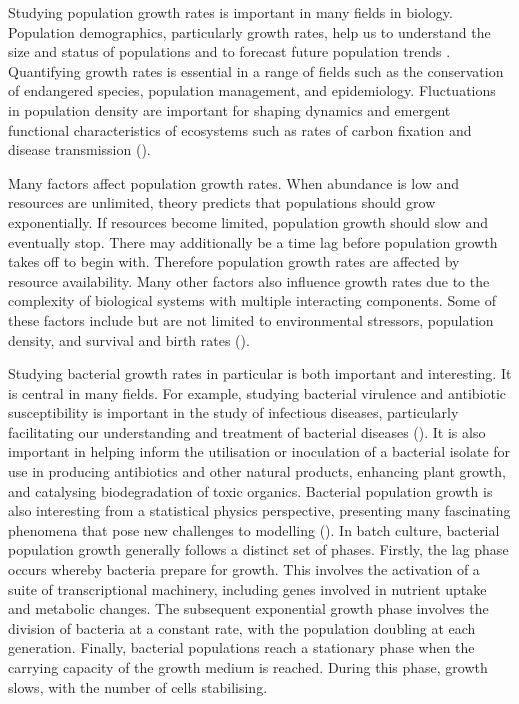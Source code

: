 \documentclass[11pt]{article}
\begin{document}
	Studying population growth rates is important in many fields in biology. Population demographics, particularly growth rates, help us to understand the size and status of populations and to forecast future population trends \cite{tarsi2012}. Quantifying growth rates is essential in a range of fields such as the conservation of endangered species, population management, and epidemiology. Fluctuations in population density are important for shaping dynamics and  emergent functional characteristics of ecosystems such as rates of carbon fixation and disease transmission (\cite{ewald1976toxicity, gao1992disease}).
	
	Many factors affect population growth rates. When abundance is low and resources are unlimited, theory predicts that populations should grow exponentially. If resources become limited, population growth should slow and eventually stop. There may additionally be a time lag before population growth takes off to begin with. Therefore population growth rates are affected by resource availability. Many other factors also influence growth rates due to the complexity of biological systems with multiple interacting components. Some of these factors include but are not limited to environmental stressors, population density, and survival and birth rates (\cite{sibly2002population, dinsmore2010assessment}).
	
	Studying bacterial growth rates in particular is both important and interesting. It is central in many fields. For example, studying bacterial virulence and antibiotic susceptibility is important in the study of infectious diseases, particularly facilitating our understanding and treatment of bacterial diseases (\cite{boulos2005molecular}). It is also important in helping inform the utilisation or inoculation of a bacterial isolate for use in producing antibiotics and other natural products, enhancing plant growth, and catalysing biodegradation of toxic organics. Bacterial population growth is also interesting from a statistical physics perspective, presenting many fascinating phenomena that pose new challenges to modelling (\cite{allen2018bacterial}). In batch culture, bacterial population growth generally follows a distinct set of phases. Firstly, the lag phase occurs whereby bacteria prepare for growth. This involves the activation of a suite of transcriptional machinery, including genes involved in nutrient uptake and metabolic changes. The subsequent exponential growth phase involves the division of bacteria at a constant rate, with the population doubling at each generation. Finally, bacterial populations reach a stationary phase when the carrying capacity of the growth medium is reached. During this phase, growth slows, with the number of cells stabilising.
	
\end{document}
